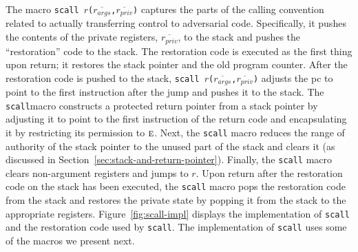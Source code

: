 \documentclass[format=acmsmall, review=true, screen=true]{acmart}
\renewcommand{\figurename}{Figure}
\newcommand{\var}[1]{\mathit{#1}}
\newcommand{\plainperm}[1]{\textsc{#1}}
\newcommand{\entry}{\plainperm{e}}
\newenvironment{toplas}{}{}
\begin{document}
\begin{toplas}
The macro \texttt{scall
  $r$($\overline{r_{\var{args}}}$,$\overline{r_{\var{priv}}}$)} captures the
parts of the calling convention related to actually transferring control to
adversarial code. Specifically, it pushes the contents of the private registers,
$\overline{r_{\var{priv}}}$, to the stack and pushes the ``restoration'' code to
the stack. The restoration code is executed as the first thing upon return; it
restores the stack pointer and the old program counter. After the restoration
code is pushed to the stack, \texttt{scall
  $r$($\overline{r_{\var{args}}}$,$\overline{r_{\var{priv}}}$)} adjusts the pc
to point to the first instruction after the jump and pushes it to the stack. The
\texttt{scall}macro constructs a protected return pointer from a stack pointer by
adjusting it to point to the first instruction of the return code and
encapsulating it by restricting its permission to $\entry$. Next, the \texttt{scall}
macro reduces the range of authority of the stack pointer to the unused part of
the stack and clears it (as discussed in Section~\ref{sec:stack-and-return-pointer}). Finally, the \texttt{scall} macro clears
non-argument registers and jumps to $r$. Upon return after the restoration code
on the stack has been executed, the \texttt{scall} macro pops the restoration code from
the stack and restores the private state by popping it from the stack to the
appropriate registers. \figurename~\ref{fig:scall-impl} displays the
implementation of \texttt{scall} and the restoration code used by
\texttt{scall}. The implementation of \texttt{scall} uses some of the macros we
present next.


\end{toplas}
\end{document}
